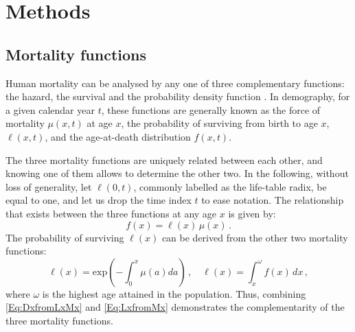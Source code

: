 \documentclass[11pt, a4paper]{article}
\begin{document}
\section{Methods}\label{Sec:Methods}

\subsection{Mortality functions}\label{Subsec:MortFun}

Human mortality can be analysed by any one of three complementary functions: the hazard, the survival and the probability density function \citep{klein2003survival}. In demography, for a given calendar year $t$, these functions are generally known as the force of mortality $\mu(x,t)$ at age $x$, the probability of surviving from birth to age $x$, $\ell(x,t)$, and the age-at-death distribution $f(x,t)$. 

The three mortality functions are uniquely related between each other, and knowing one of them allows to determine the other two. In the following, without loss of generality, let $\ell(0, t)$, commonly labelled as the life-table radix, be equal to one, and let us drop the time index $t$ to ease notation. The relationship that exists between the three functions at any age $x$ is given by:
%
\begin{equation}\label{Eq:DxfromLxMx}
f(x)  = \ell(x)\,\mu(x)\,.
\end{equation}
%
The probability of surviving  $\ell(x)$ can be derived from the other two mortality functions:
%
\begin{equation}\label{Eq:LxfromMx}
\ell(x) = \mathrm{exp} \left(- \int_{0}^{x} \mu (a)da\right)\,, \quad \ell(x) = \int_{x}^{\omega} f(x)\,dx\,,
\end{equation}
%
where $\omega$ is the highest age attained in the population. Thus, combining \eqref{Eq:DxfromLxMx} and \eqref{Eq:LxfromMx} demonstrates the complementarity of the three mortality functions.
\end{document}
